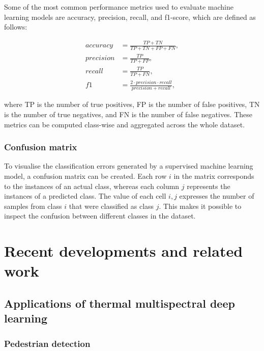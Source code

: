 \documentclass{l4proj}
\begin{document}
Some of the most common performance metrics used to evaluate machine learning models are accuracy, precision, recall, and f1-score, which are defined as follows:

\begin{align}
  accuracy  &= \frac {TP + TN} {TP + TN + FP + FN}, \\
  precision &= \frac {TP} {TP + FP}, \\
  recall    &= \frac {TP} {TP + FN}, \\
  f1        &= \frac {2 \cdot precision \cdot recall} {precision + recall},
\end{align}

where TP is the number of true positives, FP is the number of false positives, TN is the number of true negatives, and FN is the number of false negatives. These metrics can be computed class-wise and aggregated across the whole dataset.

\subsubsection{Confusion matrix}

To visualise the classification errors generated by a supervised machine learning model, a confusion matrix can be created. Each row $i$ in the matrix corresponds to the instances of an actual class, whereas each column $j$ represents the instances of a predicted class. The value of each cell $i, j$ expresses the number of samples from class $i$ that were classified as class $j$. This makes it possible to inspect the confusion between different classes in the dataset.


\section{Recent developments and related work}

\subsection{Applications of thermal multispectral deep learning}

\subsubsection{Pedestrian detection}
\end{document}
